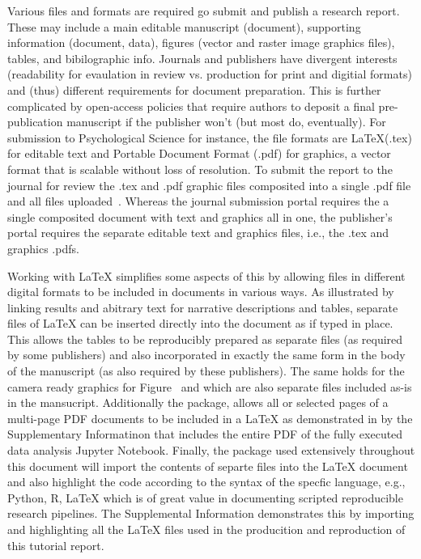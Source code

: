 \documentclass[helv,10pt,man,floatsintext]{apa6}  %
\begin{document}
Various files and formats are required go submit and publish a
research report. These may include a main editable manuscript
(document), supporting information (document, data), figures (vector
and raster image graphics files), tables, and bibilographic
info. Journals and publishers have divergent interests (readability
for evaulation in review vs. production for print and digitial
formats) and (thus) different requirements for document
preparation. This is further complicated by open-access policies that
require authors to deposit a final pre-publication manuscript if the
publisher won't (but most do, eventually).  For submission to
Psychological Science for instance, the file formats are \LaTeX (.tex)
for editable text and Portable Document Format (.pdf) for graphics, a
vector format that is scalable without loss of resolution. To submit
the report to the journal for review the .tex and .pdf graphic files
composited into a single .pdf file and all files
uploaded~\cite{PsychSciSubmissions2020, PsychSciFigs2013}. Whereas the
journal submission portal requires the a single composited document
with text and graphics all in one, the publisher's portal requires the
separate editable text and graphics files, i.e., the .tex and graphics
.pdfs.

Working with \LaTeX{} simplifies some aspects of this by allowing
files in different digital formats to be included in documents in
various ways. As illustrated by linking results and abitrary text for
narrative descriptions and tables, separate files of \LaTeX{} can be
inserted directly into the document as if typed in place. This allows
the tables to be reproducibly prepared as separate files (as required
by some publishers) and also incorporated in exactly the same form in
the body of the manuscript (as also required by these publishers). The
same holds for the camera ready graphics for Figure~ and
 which are also separate files included as-is in the
mansucript. Additionally the \texttt{} package,
allows all or selected pages of a multi-page PDF documents to be
included in a \LaTeX{} as demonstrated in by the Supplementary
Informatinon that includes the entire PDF of the fully executed data
analysis Jupyter Notebook.  Finally, the \texttt{\minted}
package used extensively throughout this document will import the
contents of separte files into the \LaTeX{} document and also
highlight the code according to the syntax of the specfic language,
e.g., Python, R, \LaTeX{} which is of great value in documenting
scripted reproducible research pipelines. The Supplemental Information
demonstrates this by importing and highlighting all the \LaTeX{} files
used in the producition and reproduction of this tutorial report.
\end{document}
